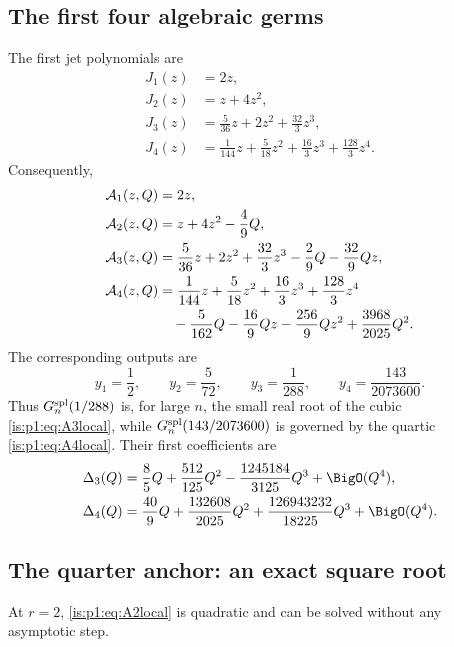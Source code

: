 \subsection{The first four algebraic germs}

The first jet polynomials are
\begin{align}
 J_1(z)&=2z,\label{is:p1:eq:J1}\\
 J_2(z)&=z+4z^2,\label{is:p1:eq:J2}\\
 J_3(z)&=\frac5{36}z+2z^2+\frac{32}{3}z^3,\label{is:p1:eq:J3}\\
 J_4(z)&=\frac1{144}z+\frac5{18}z^2+\frac{16}{3}z^3+\frac{128}{3}z^4.
 \label{is:p1:eq:J4}
\end{align}
Consequently,
\begin{align}
 \mathcal A_1(z,Q)&=2z,\label{is:p1:eq:A1local}\\
 \mathcal A_2(z,Q)&=z+4z^2-\frac49Q,\label{is:p1:eq:A2local}\\
 \mathcal A_3(z,Q)&=\frac5{36}z+2z^2+\frac{32}{3}z^3
 -\frac29Q-\frac{32}{9}Qz,\label{is:p1:eq:A3local}\\
 \mathcal A_4(z,Q)&=\frac1{144}z+\frac5{18}z^2+\frac{16}{3}z^3+\frac{128}{3}z^4
 \notag\\
 &\quad-\frac5{162}Q-\frac{16}{9}Qz-\frac{256}{9}Qz^2
 +\frac{3968}{2025}Q^2.
 \label{is:p1:eq:A4local}
\end{align}
The corresponding outputs are
\begin{equation}
 y_1=\frac12,
 \qquad y_2=\frac5{72},
 \qquad y_3=\frac1{288},
 \qquad y_4=\frac{143}{2073600}.
 \label{is:p1:eq:y-first}
\end{equation}
Thus $G_{n}^{\mathrm{spl}}(1/288)$ is, for large $n$, the small real root of the cubic
\eqref{is:p1:eq:A3local}, while $G_{n}^{\mathrm{spl}}(143/2073600)$ is governed by the quartic
\eqref{is:p1:eq:A4local}.  Their first coefficients are
\begin{align}
 \Delta_3(Q)&=\frac85Q+\frac{512}{125}Q^2
 -\frac{1245184}{3125}Q^3+\BigO(Q^4),
 \label{is:p1:eq:Delta3}\\
 \Delta_4(Q)&=\frac{40}{9}Q+\frac{132608}{2025}Q^2
 +\frac{126943232}{18225}Q^3+\BigO(Q^4).
 \label{is:p1:eq:Delta4}
\end{align}

\subsection{The quarter anchor: an exact square root}

At $r=2$, \eqref{is:p1:eq:A2local} is quadratic and can be solved without any
asymptotic step.

